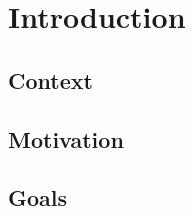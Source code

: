 \chapter{Introduction} \label{chap:introduction} 
\hspace{0.5cm}
\section {Context} \label{context}
\hspace{0.5cm} 
\section {Motivation}
\hspace{0.5cm} 
\section {Goals}
\hspace{0.5cm} 
